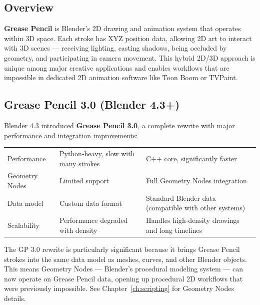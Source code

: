 \subsection{Overview}

\textbf{Grease Pencil} is Blender's 2D drawing and animation system that operates within 3D space. Each stroke has XYZ position data, allowing 2D art to interact with 3D scenes --- receiving lighting, casting shadows, being occluded by geometry, and participating in camera movement. This hybrid 2D/3D approach is unique among major creative applications and enables workflows that are impossible in dedicated 2D animation software like Toon Boom or TVPaint.

\subsection{Grease Pencil 3.0 (Blender 4.3+)}

Blender 4.3 introduced \textbf{Grease Pencil 3.0}, a complete rewrite with major performance and integration improvements:

\vspace{0.5em}
\begin{tabularx}{\textwidth}{l L{4cm} L{4cm}}
\toprule
{}
 &  &  \\
\midrule
Performance & Python-heavy, slow with many strokes & C++ core, significantly faster \\
Geometry Nodes & Limited support & Full Geometry Nodes integration \\
Data model & Custom data format & Standard Blender data (compatible with other systems) \\
Scalability & Performance degraded with density & Handles high-density drawings and long timelines \\
\bottomrule
\end{tabularx}
\vspace{0.5em}

The GP 3.0 rewrite is particularly significant because it brings Grease Pencil strokes into the same data model as meshes, curves, and other Blender objects. This means Geometry Nodes --- Blender's procedural modeling system --- can now operate on Grease Pencil data, opening up procedural 2D workflows that were previously impossible. See Chapter~\ref{ch:scripting} for Geometry Nodes details.

